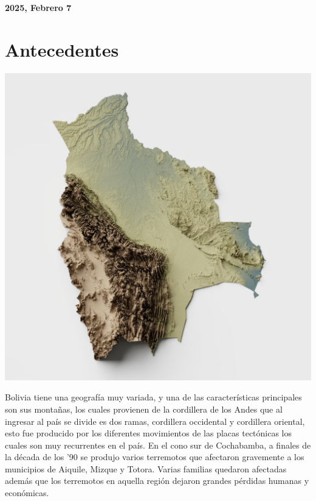 \documentclass[12pt]{article}
\begin{document}
\begin{center}
    \large \bf 2025, Febrero 7
\end{center}

\thispagestyle{empty}

\setcounter{page}{0}

\newpage

\tableofcontents 

\newpage

\section{Antecedentes}


\begin{center}
  \includegraphics[width=15cm]{bolivian_map}
\end{center}

Bolivia tiene una geografía muy variada, y una de las características principales son sus montañas, los cuales provienen de la cordillera de los Andes que al ingresar al país se divide es dos ramas, cordillera occidental y cordillera oriental, esto fue producido por los diferentes movimientos de las placas tectónicas los cuales son muy recurrentes en el país.
En el cono sur de Cochabamba, a finales de la década de los ’90 se produjo varios terremotos que afectaron gravemente a los municipios de Aiquile, Mizque y Totora. Varias familias quedaron afectadas además que los terremotos en aquella región dejaron grandes pérdidas humanas y económicas.
\\
\end{document}
